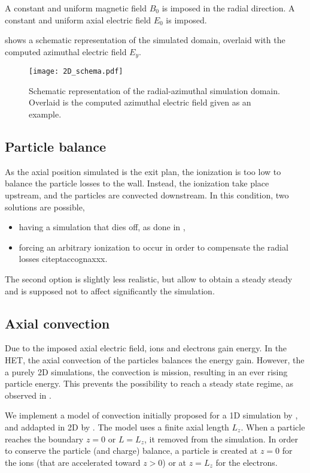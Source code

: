 A constant and uniform magnetic field $B_0$ is imposed in the radial direction.
A constant and uniform axial electric field $E_0$ is imposed.

 shows a schematic representation of the simulated domain, overlaid with the computed azimuthal electric field $E_y$.

\begin{figure}[hbtp]
  \centering
  \texttt{[image: 2D\_schema.pdf]}
  \caption{Schematic representation of the radial-azimuthal simulation domain. Overlaid is the computed azimuthal electric field given as an example. }
  \label{fig-2dschemat}
\end{figure}

\subsection{Particle balance}
As the axial position simulated is the exit plan, the ionization is too low to balance the particle losses to the wall.
Instead, the ionization take place upstream, and the particles are convected downstream.
In this condition, two solutions are possible,
\begin{itemize}
  \item having a simulation that dies off, as done in \citet{janhunen2018},
  \item forcing an arbitrary ionization to occur in order to compensate the radial losses citep{taccognaxxx}.
\end{itemize}
The second option is slightly less realistic, but allow to obtain a steady steady and is supposed not to affect significantly the simulation.


\subsection{Axial convection}

Due to the imposed axial electric field, ions and electrons gain energy.
In the \ac{HET}, the axial convection of the particles balances the energy gain.
However, the a purely \ac{2D} simulations, the convection is mission, resulting in an ever rising particle energy.
This prevents the possibility to reach a steady state regime, as observed in \citet{heron2013,janhunen2018}.

We implement a model of convection initially proposed for a \ac{1D} simulation by \citet{lafleur2016a}, and addapted in \ac{2D} by \citet{croes2017a}.
The model uses a finite axial length $L_z$.
When a particle reaches the boundary $z=0$ or $L=L_z$, it removed from the simulation.
In order to conserve the particle (and charge) balance, a particle is created at $z=0$ for the ions (that are accelerated toward $z>0$) or at $z=L_z$ for the electrons.

